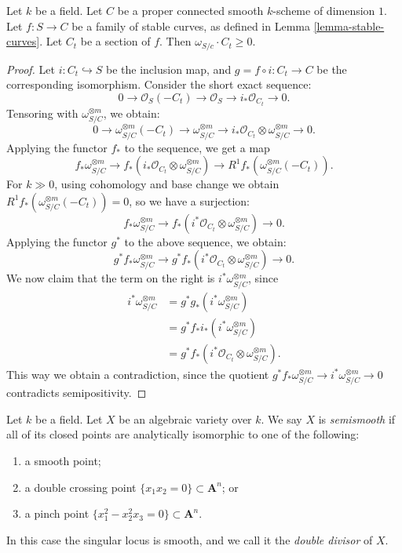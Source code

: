 \begin{lemma}[cf.\ {\cite[Theorem 4.6]{Ko90}}]
\label{lemma-stable-curves-semipositive}
Let $k$ be a field.
Let $C$ be a proper connected smooth $k$-scheme of dimension $1$.
Let $f : S \to C$ be a family of stable curves,
as defined in Lemma \ref{lemma-stable-curves}.
Let $C_t$ be a section of $f$.
Then $\omega_{S/c}\cdot C_t\geq 0$.
\end{lemma}

\begin{proof}
Let $i:C_t\hookrightarrow S$ be the inclusion map, and $g=f\circ i:C_t\to C$ be the corresponding isomorphism.
Consider the short exact sequence:
$$0\to \mathcal{O}_S(-C_t)\to\mathcal{O}_S\to i_*\mathcal{O}_{C_t}\to 0.$$
Tensoring with $\omega_{S/C}^{\otimes m}$, we obtain:
$$0\to \omega_{S/C}^{\otimes m}(-C_t)\to \omega_{S/C}^{\otimes m}\to i_*\mathcal{O}_{C_t}\otimes\omega_{S/C}^{\otimes m}\to 0.$$
Applying the functor $f_*$ to the sequence, we get a map
$$f_*\omega_{S/C}^{\otimes m}\to f_*(i_*\mathcal{O}_{C_t}\otimes \omega_{S/C}^{\otimes m})\to R^1f_*(\omega_{S/C}^{\otimes m}(-C_t)).$$
For $k\gg 0$, using cohomology and base change we obtain $R^1f_*(\omega_{S/C}^{\otimes m}(-C_t))=0$, so we have a surjection:
$$f_*\omega_{S/C}^{\otimes m}\to f_*(i^*\mathcal{O}_{C_t}\otimes \omega_{S/C}^{\otimes m})\to 0.$$
Applying the functor $g^*$ to the above sequence, we obtain:
$$g^*f_*\omega_{S/C}^{\otimes m}\to g^*f_*(i^*\mathcal{O}_{C_t}\otimes \omega_{S/C}^{\otimes m})\to 0.$$
We now claim that the term on the right is $i^*\omega_{S/C}^{\otimes m}$, since
\begin{align}
i^*\omega_{S/C}^{\otimes m}& =g^*g_*(i^*\omega_{S/C}^{\otimes m})\nonumber\\
& =g^*f_*i_*(i^*\omega_{S/C}^{\otimes m})\nonumber\\
&=g^*f_*(i^*\mathcal{O}_{C_t}\otimes \omega_{S/C}^{\otimes m}).\nonumber
\end{align}
This way we obtain a contradiction, since the quotient $g^*f_*\omega_{S/C}^{\otimes m}\to i^*\omega_{S/C}^{\otimes m}\to 0$ contradicts semipositivity.
\end{proof}


\begin{definition}[cf.\ {\cite[Definition 4.1(i)]{Ko90}}]
\label{definition-semismooth}
Let $k$ be a field.
Let $X$ be an algebraic variety over $k$.
We say $X$ is {\it semismooth} if all of its closed points are analytically
isomorphic to one of the following:
\begin{enumerate}
\item a smooth point;
\item a double crossing point $\{x_1x_2 = 0\} \subset \mathbf{A}^n$; or
\item a pinch point $\{x_1^2 - x_2^2x_3 = 0\} \subset \mathbf{A}^n$.
\end{enumerate}
In this case the singular locus is smooth, and we call it the {\it double
divisor} of $X$.
\end{definition}

